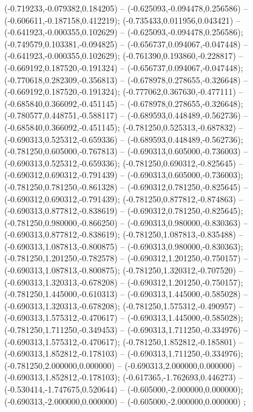  (-0.719233,-0.079382,0.184205) -- (-0.625093,-0.094478,0.256586) -- (-0.606611,-0.187158,0.412219);
 (-0.735433,0.011956,0.043421) -- (-0.641923,-0.000355,0.102629) -- (-0.625093,-0.094478,0.256586);
 (-0.749579,0.103381,-0.094825) -- (-0.656737,0.094067,-0.047448) -- (-0.641923,-0.000355,0.102629);
 (-0.761390,0.193860,-0.228817) -- (-0.669192,0.187520,-0.191324) -- (-0.656737,0.094067,-0.047448);
 (-0.770618,0.282309,-0.356813) -- (-0.678978,0.278655,-0.326648) -- (-0.669192,0.187520,-0.191324);
 (-0.777062,0.367630,-0.477111) -- (-0.685840,0.366092,-0.451145) -- (-0.678978,0.278655,-0.326648);
 (-0.780577,0.448751,-0.588117) -- (-0.689593,0.448489,-0.562736) -- (-0.685840,0.366092,-0.451145);
 (-0.781250,0.525313,-0.687832) -- (-0.690313,0.525312,-0.659336) -- (-0.689593,0.448489,-0.562736);
 (-0.781250,0.605000,-0.767813) -- (-0.690313,0.605000,-0.736003) -- (-0.690313,0.525312,-0.659336);
 (-0.781250,0.690312,-0.825645) -- (-0.690312,0.690312,-0.791439) -- (-0.690313,0.605000,-0.736003);
 (-0.781250,0.781250,-0.861328) -- (-0.690312,0.781250,-0.825645) -- (-0.690312,0.690312,-0.791439);
 (-0.781250,0.877812,-0.874863) -- (-0.690313,0.877812,-0.838619) -- (-0.690312,0.781250,-0.825645);
 (-0.781250,0.980000,-0.866250) -- (-0.690313,0.980000,-0.830363) -- (-0.690313,0.877812,-0.838619);
 (-0.781250,1.087813,-0.835488) -- (-0.690313,1.087813,-0.800875) -- (-0.690313,0.980000,-0.830363);
 (-0.781250,1.201250,-0.782578) -- (-0.690312,1.201250,-0.750157) -- (-0.690313,1.087813,-0.800875);
 (-0.781250,1.320312,-0.707520) -- (-0.690313,1.320313,-0.678208) -- (-0.690312,1.201250,-0.750157);
 (-0.781250,1.445000,-0.610313) -- (-0.690313,1.445000,-0.585028) -- (-0.690313,1.320313,-0.678208);
 (-0.781250,1.575312,-0.490957) -- (-0.690313,1.575312,-0.470617) -- (-0.690313,1.445000,-0.585028);
 (-0.781250,1.711250,-0.349453) -- (-0.690313,1.711250,-0.334976) -- (-0.690313,1.575312,-0.470617);
 (-0.781250,1.852812,-0.185801) -- (-0.690313,1.852812,-0.178103) -- (-0.690313,1.711250,-0.334976);
 (-0.781250,2.000000,0.000000) -- (-0.690313,2.000000,0.000000) -- (-0.690313,1.852812,-0.178103);
 (-0.617365,-1.762693,0.446273) -- (-0.530414,-1.747675,0.520644) -- (-0.605000,-2.000000,0.000000);
 (-0.690313,-2.000000,0.000000) -- (-0.605000,-2.000000,0.000000) ;
